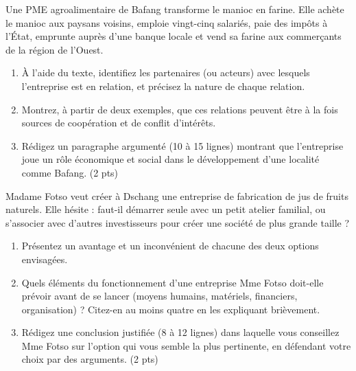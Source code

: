 \documentclass[11pt]{article}
\begin{document}
\begin{exercice}
Une PME agroalimentaire de Bafang transforme le manioc en farine. Elle achète le manioc aux paysans voisins, emploie vingt-cinq salariés, paie des impôts à l'État, emprunte auprès d'une banque locale et vend sa farine aux commerçants de la région de l'Ouest.
\begin{enumerate}
\item À l'aide du texte, identifiez les partenaires (ou acteurs) avec lesquels l'entreprise est en relation, et précisez la nature de chaque relation.
\item Montrez, à partir de deux exemples, que ces relations peuvent être à la fois sources de coopération et de conflit d'intérêts.
\item Rédigez un paragraphe argumenté (10 à 15 lignes) montrant que l'entreprise joue un rôle économique et social dans le développement d'une localité comme Bafang. (2 pts)
\end{enumerate}
\end{exercice}

\begin{exercice}
Madame Fotso veut créer à Dschang une entreprise de fabrication de jus de fruits naturels. Elle hésite : faut-il démarrer seule avec un petit atelier familial, ou s'associer avec d'autres investisseurs pour créer une société de plus grande taille ?
\begin{enumerate}
\item Présentez un avantage et un inconvénient de chacune des deux options envisagées.
\item Quels éléments du fonctionnement d'une entreprise Mme Fotso doit-elle prévoir avant de se lancer (moyens humains, matériels, financiers, organisation) ? Citez-en au moins quatre en les expliquant brièvement.
\item Rédigez une conclusion justifiée (8 à 12 lignes) dans laquelle vous conseillez Mme Fotso sur l'option qui vous semble la plus pertinente, en défendant votre choix par des arguments. (2 pts)
\end{enumerate}
\end{exercice}
\end{document}
